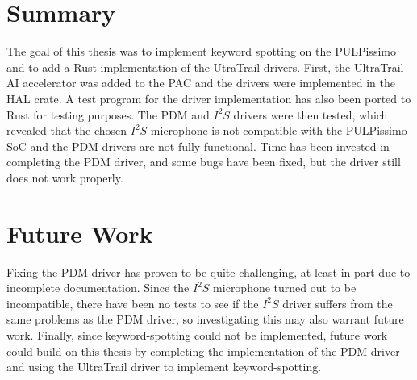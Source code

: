 
\section{Summary}

The goal of this thesis was to implement keyword spotting on the PULPissimo and to add a Rust implementation of the UtraTrail drivers.
First, the UltraTrail AI accelerator was added to the PAC and the drivers were implemented in the HAL crate.
A test program for the driver implementation has also been ported to Rust for testing purposes.
The PDM and $I^2S$ drivers were then tested, which revealed that the chosen $I^2S$
microphone is not compatible with the PULPissimo SoC and the PDM drivers are not fully functional.
Time has been invested in completing the PDM driver, and some bugs have been fixed, but the driver still does not work properly.

\section{Future Work}

Fixing the PDM driver has proven to be quite challenging, at least in part due to incomplete documentation.
Since the $I^2S$ microphone turned out to be incompatible, there have been no tests to see if the $I^2S$
driver suffers from the same problems as the PDM driver, so investigating this may also warrant future work.
Finally, since keyword-spotting could not be implemented, future work could build on this thesis by completing
the implementation of the PDM driver and using the UltraTrail driver to implement keyword-spotting.
